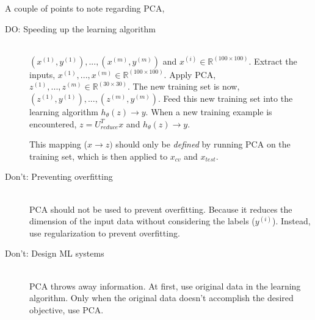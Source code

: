 \vspace{0.5cm}

\pagebreak

\noindent A couple of points to note regarding PCA,

\begin{description}
	\item[DO: Speeding up the learning algorithm] \hfill \\
		$ (x^{(1)}, y^{(1)}), ..., (x^{(m)}, y^{(m)}) $ and $ x^{(i)} \in \mathbb{R}^{(100 \times 100)} $.
		Extract the inputs, $ x^{(1)}, ... , x^{(m)} \in \mathbb{R}^{(100 \times 100)} $.
		Apply PCA, $ z^{(1)}, ..., z^{(m)} \in \mathbb{R}^{(30 \times 30)} $.
		The new training set is now, $ (z^{(1)}, y^{(1)}), ..., (z^{(m)}, y^{(m)}) $.
		Feed this new training set into the learning algorithm $ h_\theta (z) \rightarrow y $. When a new
		training example is encountered, $ z = U_{reduce}^T x $ and $ h_\theta(z) \rightarrow y $.

		This mapping ($ x \rightarrow z) $ should only be \emph{defined} by running PCA on the training
		set, which is then applied to $ x_{cv} $ and $ x_{test} $.

	\item[Don't: Preventing overfitting] \hfill \\
		PCA should not be used to prevent overfitting. Because it reduces the dimension of the input
		data without considering the labels ($ y^{(i)} $). Instead, use regularization to prevent
		overfitting.

	\item[Don't: Design ML systems] \hfill \\
		PCA throws away information. At first, use original data in the learning algorithm. Only when
		the original data doesn't accomplish the desired objective, use PCA.

\end{description}


